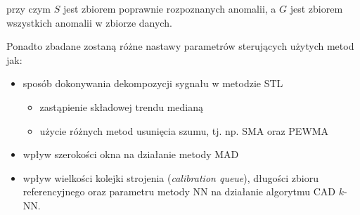 \documentclass{article}
\begin{document}
przy czym \(S\) jest zbiorem poprawnie rozpoznanych anomalii, a \(G\)
jest zbiorem wszystkich anomalii w zbiorze danych.

Ponadto zbadane zostaną różne nastawy parametrów sterujących użytych
metod jak:

\begin{itemize}
\item
  sposób dokonywania dekompozycji sygnału w metodzie STL

  \begin{itemize}
  \item
    zastąpienie składowej trendu medianą \cite{adts-cloud}
  \item
    użycie różnych metod usunięcia szumu, tj. np. SMA oraz PEWMA
  \end{itemize}
\item
  wpływ szerokości okna na działanie metody MAD
\item
  wpływ wielkości kolejki strojenia (\emph{calibration queue}), długości
  zbioru referencyjnego oraz parametru metody NN na działanie algorytmu
  CAD $k$-NN.
\end{itemize}

 

\end{document}
